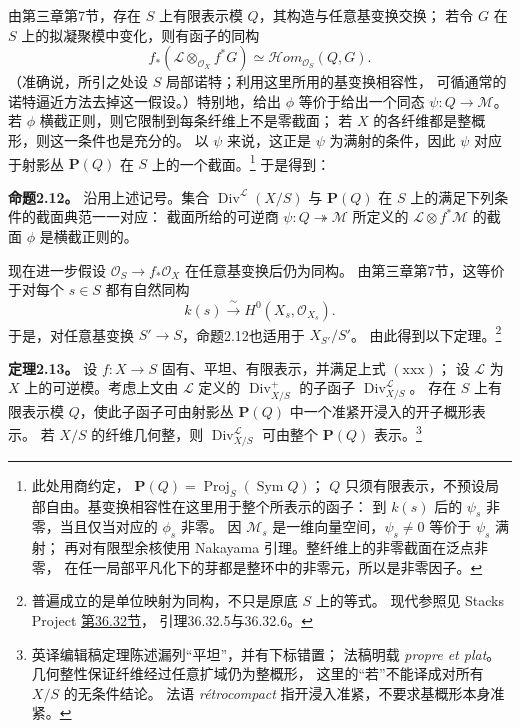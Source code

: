 \documentclass[openany,fontset=fandol]{ctexbook}
\newcommand{\OO}{\mathcal O}
\newcommand{\LL}{\mathcal L}
\newcommand{\MM}{\mathcal M}
\newcommand{\HH}{\mathcal H om}
\newcommand{\Div}{\operatorname{Div}}
\newcommand{\PP}{\mathbf P}
\begin{document}
由第三章第7节，存在 \(S\) 上有限表示模 \(Q\)，其构造与任意基变换交换；
若令 \(G\) 在 \(S\) 上的拟凝聚模中变化，则有函子的同构
\[
 f_*(\LL\otimes_{\OO_X} f^*G)\simeq\HH_{\OO_S}(Q,G).
\]
（准确说，所引之处设 \(S\) 局部诺特；利用这里所用的基变换相容性，
可循通常的诺特逼近方法去掉这一假设。）特别地，给出 \(\phi\)
等价于给出一个同态 \(\psi:Q\to\MM\)。
若 \(\phi\) 横截正则，则它限制到每条纤维上不是零截面；
若 \(X\) 的各纤维都是整概形，则这一条件也是充分的。
以 \(\psi\) 来说，这正是 \(\psi\) 为满射的条件，因此
\(\psi\) 对应于射影丛 \(\PP(Q)\) 在 \(S\) 上的一个截面。\footnote{此处用商约定，
\(\PP(Q)=\operatorname{Proj}_S(\operatorname{Sym}Q)\)；
\(Q\) 只须有限表示，不预设局部自由。基变换相容性在这里用于整个所表示的函子：
到 \(k(s)\) 后的 \(\psi_s\) 非零，当且仅当对应的 \(\phi_s\) 非零。
因 \(\MM_s\) 是一维向量空间，\(\psi_s\ne0\) 等价于 \(\psi_s\) 满射；
再对有限型余核使用 Nakayama 引理。整纤维上的非零截面在泛点非零，
在任一局部平凡化下的芽都是整环中的非零元，所以是非零因子。}
于是得到：

\medskip
\noindent\textbf{命题2.12。}
沿用上述记号。集合 \(\Div^{\LL}(X/S)\) 与 \(\PP(Q)\) 在 \(S\) 上的满足下列条件的截面典范一一对应：
截面所给的可逆商 \(\psi:Q\twoheadrightarrow\MM\) 所定义的
\(\LL\otimes f^*\MM\) 的截面 \(\phi\) 是横截正则的。

现在进一步假设 \(\OO_S\to f_*\OO_X\) 在任意基变换后仍为同构。
由第三章第7节，这等价于对每个 \(s\in S\) 都有自然同构
\begin{equation}
 k(s)\xrightarrow{\;\sim\;} H^0(X_s,\OO_{X_s}).
 \tag{xxx}
\end{equation}
于是，对任意基变换 \(S'\to S\)，命题2.12也适用于 \(X_{S'}/S'\)。
由此得到以下定理。\footnote{普遍成立的是单位映射为同构，不只是原底 \(S\) 上的等式。
现代参照见 Stacks Project \href{https://stacks.math.columbia.edu/tag/0BDM}{第36.32节}，
引理36.32.5与36.32.6。}

\clearpage
\noindent\textbf{定理2.13。}
设 \(f:X\to S\) 固有、平坦、有限表示，并满足上式 \((\mathrm{xxx})\)；
设 \(\LL\) 为 \(X\) 上的可逆模。考虑上文由 \(\LL\) 定义的
\(\Div^+_{X/S}\) 的子函子 \(\Div^{\LL}_{X/S}\)。
存在 \(S\) 上有限表示模 \(Q\)，使此子函子可由射影丛
\(\PP(Q)\) 中一个准紧开浸入的开子概形表示。
若 \(X/S\) 的纤维几何整，则 \(\Div^{\LL}_{X/S}\) 可由整个
\(\PP(Q)\) 表示。\footnote{英译编辑稿定理陈述漏列“平坦”，并有下标错置；
法稿明载 \emph{propre et plat}。几何整性保证纤维经过任意扩域仍为整概形，
这里的“若”不能译成对所有 \(X/S\) 的无条件结论。
法语 \emph{rétrocompact} 指开浸入准紧，不要求基概形本身准紧。}
\end{document}

